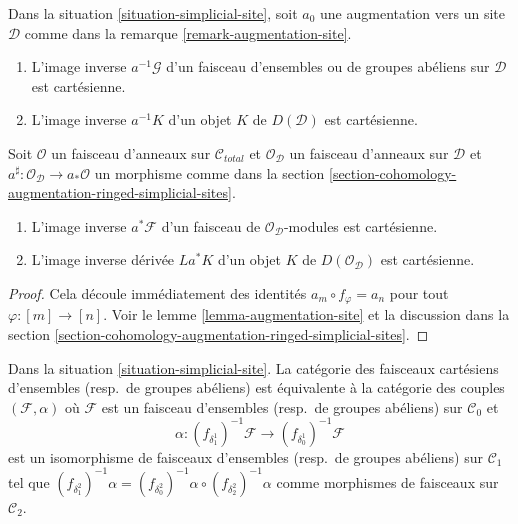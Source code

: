 \begin{lemma}
\label{lemma-augmentation-cartesian-module}
Dans la situation \ref{situation-simplicial-site}, soit
$a_0$ une augmentation vers un site $\mathcal{D}$ comme dans la
remarque \ref{remark-augmentation-site}.
\begin{enumerate}
\item L'image inverse $a^{-1}\mathcal{G}$ d'un faisceau d'ensembles ou de groupes abéliens
sur $\mathcal{D}$ est cartésienne.
\item L'image inverse $a^{-1}K$ d'un objet $K$ de $D(\mathcal{D})$
est cartésienne.
\end{enumerate}
Soit $\mathcal{O}$ un faisceau d'anneaux sur $\mathcal{C}_{total}$ et
$\mathcal{O}_\mathcal{D}$ un faisceau d'anneaux sur $\mathcal{D}$
et $a^\sharp : \mathcal{O}_\mathcal{D} \to a_*\mathcal{O}$ un
morphisme comme dans la section
\ref{section-cohomology-augmentation-ringed-simplicial-sites}.
\begin{enumerate}
\item[(3)] L'image inverse $a^*\mathcal{F}$ d'un faisceau de
$\mathcal{O}_\mathcal{D}$-modules est cartésienne.
\item[(4)] L'image inverse dérivée $La^*K$ d'un objet
$K$ de $D(\mathcal{O}_\mathcal{D})$ est cartésienne.
\end{enumerate}
\end{lemma}

\begin{proof}
Cela découle immédiatement des identités
$a_m \circ f_\varphi = a_n$ pour tout $\varphi : [m] \to [n]$.
Voir le lemme \ref{lemma-augmentation-site} et la discussion dans la section
\ref{section-cohomology-augmentation-ringed-simplicial-sites}.
\end{proof}

\begin{lemma}
\label{lemma-characterize-cartesian}
Dans la situation \ref{situation-simplicial-site}.
La catégorie des faisceaux cartésiens d'ensembles (resp.\ de groupes abéliens)
est équivalente à la catégorie des couples $(\mathcal{F}, \alpha)$
où $\mathcal{F}$ est un faisceau d'ensembles (resp.\ de groupes abéliens)
sur $\mathcal{C}_0$ et
$$
\alpha :
(f_{\delta_1^1})^{-1}\mathcal{F}
\longrightarrow (f_{\delta_0^1})^{-1}\mathcal{F}
$$
est un isomorphisme de faisceaux d'ensembles (resp.\ de groupes abéliens)
sur $\mathcal{C}_1$ tel que
$(f_{\delta^2_1})^{-1}\alpha =
(f_{\delta^2_0})^{-1}\alpha \circ (f_{\delta^2_2})^{-1}\alpha$
comme morphismes de faisceaux sur $\mathcal{C}_2$.
\end{lemma}

